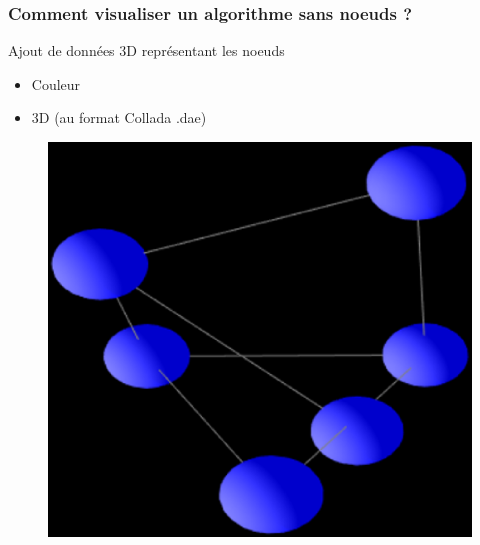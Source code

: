 \documentclass[handout]{beamer}
\begin{document}
\begin{frame}
  \frametitle{Comment visualiser un algorithme sans noeuds ?}

  \begin{block}{Ajout de données 3D représentant les noeuds}
    \begin{itemize}
    \item Couleur
    \item 3D (au format Collada .dae)
    \end{itemize}
  \end{block}

  \begin{figure}[h]
    \begin{center}
      \includegraphics[scale=0.3]{contents/gnode}
    \end{center}
    \label{fig:gnode}
  \end{figure}
\end{frame}
\end{document}
